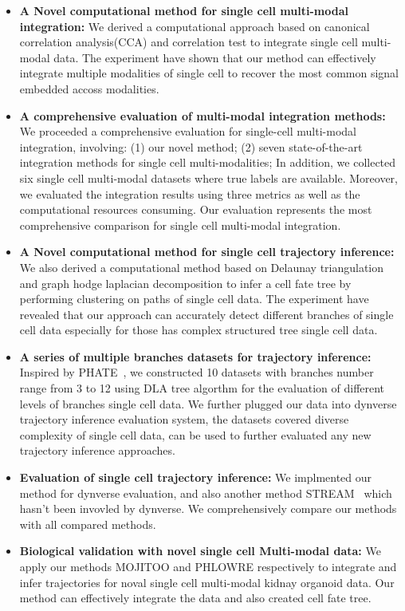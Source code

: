 \begin{itemize}
	\item \textbf{A Novel computational method for single cell multi-modal integration:} We derived a computational approach based on canonical correlation analysis(CCA) and correlation test to integrate single cell multi-modal data. The experiment have shown that our method can effectively integrate multiple modalities of single cell to recover the most common signal embedded accoss modalities.

	\item \textbf{A comprehensive evaluation of multi-modal integration methods:} We proceeded a comprehensive evaluation for single-cell multi-modal integration, involving: (1) our novel method; (2) seven state-of-the-art integration methods for single cell multi-modalities; In addition, we collected six single cell multi-modal datasets where true labels are available. Moreover, we evaluated the integration results using three metrics as well as the computational resources consuming. Our evaluation represents the most comprehensive comparison for single cell multi-modal integration.

	\item \textbf{A Novel computational method for single cell trajectory inference:} We also derived a computational method based on Delaunay triangulation and graph hodge laplacian decomposition to infer a cell fate tree by performing clustering on paths of single cell data. The experiment have revealed that our approach can accurately detect different branches of single cell data especially for those has complex structured tree single cell data.

	\item \textbf{A series of multiple branches datasets for trajectory inference:} Inspired by PHATE~\citep{moon2017phate}, we constructed 10 datasets with branches number range from 3 to 12 using DLA tree algorthm for the evaluation of different levels of branches single cell data. We further plugged our data into dynverse trajectory inference evaluation system, the datasets covered diverse complexity of single cell data, can be used to further evaluated any new trajectory inference approaches.

	\item \textbf{Evaluation of single cell trajectory inference:} We implmented our method for dynverse evaluation, and also another method STREAM~\citep{chen2019stream} which hasn't been invovled by dynverse. We comprehensively compare our methods with all compared methods.

	\item \textbf{Biological validation with novel single cell Multi-modal data:} We apply our methods MOJITOO and PHLOWRE respectively to integrate and infer trajectories for noval single cell multi-modal kidnay organoid data. Our method can effectively integrate the data and also created cell fate tree.
\end{itemize}


